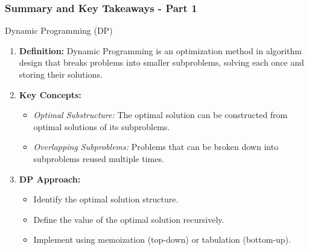 \documentclass[aspectratio=169]{beamer}
\begin{document}
\begin{frame}[fragile]
    \frametitle{Summary and Key Takeaways - Part 1}
    
    \begin{block}{Dynamic Programming (DP)}
        \begin{enumerate}
            \item \textbf{Definition:} 
            Dynamic Programming is an optimization method in algorithm design that breaks problems into smaller subproblems, solving each once and storing their solutions.
            
            \item \textbf{Key Concepts:}
            \begin{itemize}
                \item \textit{Optimal Substructure:} The optimal solution can be constructed from optimal solutions of its subproblems.
                \item \textit{Overlapping Subproblems:} Problems that can be broken down into subproblems reused multiple times.
            \end{itemize}
            
            \item \textbf{DP Approach:}
            \begin{itemize}
                \item Identify the optimal solution structure.
                \item Define the value of the optimal solution recursively.
                \item Implement using memoization (top-down) or tabulation (bottom-up).
            \end{itemize}
        \end{enumerate}
    \end{block}
\end{frame}
\end{document}

